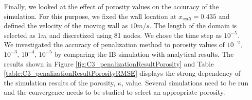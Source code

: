 Finally, we looked at the effect of porosity values on the accuracy of the simulation. For this purpose, we fixed the wall location at $x_{wall} = 0.435$ and defined the velocity of the moving wall as $10 m/s$. The length of the domain is selected as $1 m$ and discretized using 81 nodes. We chose the time step as $10^{-5}$. We investigated the accuracy of penalization method to porosity values of $10^{-2}$, $10^{-3}$, $10^{-4}$, $10^{-5}$ by comparing the IB simulation with analytical results. The results shown in Figure \ref{fig:C3_penalizationResultPorosity} and Table \ref{table:C3_penalizationResultPorosityRMSE} displays the strong dependency of the simulation results of the porosity, $\kappa$, value. Several simulations need to be run and the convergence needs to be studied to select an appropriate porosity.

\begin{figure}[H]
    \centering
    \quad
    \\
\end{figure}
